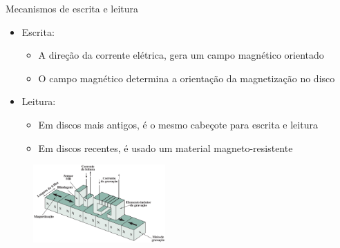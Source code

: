 \begin{slide}{Mecanismos de escrita e leitura}
	\begin{itemize}
		\item Escrita:
			\begin{itemize}
				\item A direção da corrente elétrica, gera um campo magnético orientado
				\item O campo magnético determina a orientação da magnetização no disco
			\end{itemize}
		\item Leitura:
			\begin{itemize}
				\item Em discos mais antigos, é o mesmo cabeçote para escrita e leitura
				\item Em discos recentes, é usado um material magneto-resistente 
			\end{itemize}
	\end{itemize}
	\begin{figure}[h]
		\centering
		\includegraphics[width=0.45\textwidth]{figs/cabeca-gravacao-leitura}
	\end{figure}
\end{slide}

